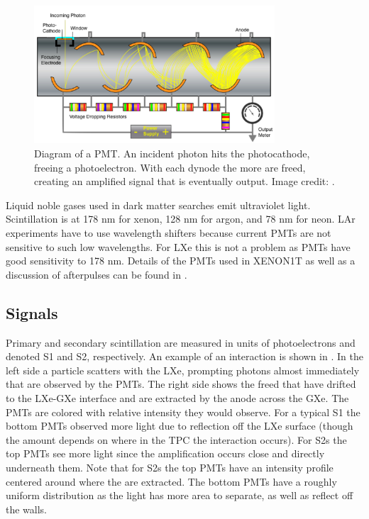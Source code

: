 \begin{figure}
\centering
\includegraphics[width=0.8\textwidth]{PMT1Better}
\caption{Diagram of a PMT.  An incident photon hits the photocathode, freeing a photoelectron.  With each dynode the more \electron are
freed, creating an amplified signal that is eventually output.  Image credit: .}
\label{fig:tpcs_pmts_pmt_diagram}
\end{figure}

Liquid noble gases used in dark matter searches emit ultraviolet light.  Scintillation is at 178 nm for xenon, 128 nm for argon, and
78 nm for neon.  LAr experiments have to use wavelength shifters because current PMTs are not sensitive to such low wavelengths.  For
LXe this is not a problem as PMTs have good sensitivity to 178 nm.  Details of the PMTs used in XENON1T as well as a discussion of
afterpulses can be found in .



\subsection{Signals}
\label{subsec:tpcs_signals}
Primary and secondary scintillation are measured in units of photoelectrons and denoted S1 and S2, respectively.  An example of an
interaction is shown in .  In the left side a particle scatters with the LXe, prompting photons almost
immediately that are observed by the PMTs.  The right side shows the freed \electron that have drifted to the LXe-GXe interface and
are extracted by the anode across the GXe.  The PMTs are colored with relative intensity they would observe.  For a typical S1 the
bottom PMTs observed more light due to reflection off the LXe surface (though the amount depends on where in the TPC the interaction
occurs).  For S2s the top PMTs see more light since the amplification occurs close and directly underneath them.  Note that for S2s
the top PMTs have an intensity profile centered around where the \electron are extracted.  The bottom PMTs have a roughly uniform
distribution as the light has more area to separate, as well as reflect off the walls.

